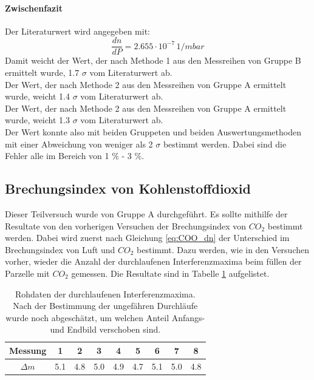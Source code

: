 \documentclass[12pt,a4paper]{article}
\begin{document}
\paragraph{Zwischenfazit}
Der Literaturwert wird angegeben mit:
\begin{equation*}
\dfrac{dn}{dP} = 2.655 \cdot 10^{-7} \, \si{1/mbar}
\end{equation*}
Damit weicht der Wert, der nach Methode 1 aus den Messreihen von Gruppe B ermittelt wurde, 1.7 $\sigma$ vom Literaturwert ab.\\
Der Wert, der nach Methode 2 aus den Messreihen von Gruppe A ermittelt wurde, weicht 1.4 $\sigma$ vom Literaturwert ab.\\
Der Wert, der nach Methode 2 aus den Messreihen von Gruppe A ermittelt wurde, weicht 1.3 $\sigma$ vom Literaturwert ab.\\
Der Wert konnte also mit beiden Gruppeten und beiden Auswertungsmethoden mit einer Abweichung von weniger als 2 $\sigma$ bestimmt werden. Dabei sind die Fehler alle im Bereich von 1 \% - 3 \%.

\newpage

\subsection{Brechungsindex von Kohlenstoffdioxid}
Dieser Teilversuch wurde von Gruppe A durchgeführt.
Es sollte mithilfe der Resultate von den vorherigen Versuchen der Brechungsindex von $CO_2$ bestimmt werden. Dabei wird zuerst nach Gleichung \ref{eq:COO_dn} der Unterschied im Brechungsindex von Luft und $CO_2$ bestimmt. Dazu werden, wie in den Versuchen vorher, wieder die Anzahl der durchlaufenen Interferenzmaxima beim füllen der Parzelle mit $CO_2$ gemessen. Die Resultate sind in Tabelle \ref{tab:COO_Rohdaten} aufgelistet.

\begin{table}
\center
\begin{tabular}{|c|c|c|c|c|c|c|c|c|}
\hline
Messung & 1 & 2 & 3 & 4 & 5 & 6 & 7 & 8\\
\hline
$\Delta m$ & 5.1 & 4.8 & 5.0 & 4.9 & 4.7 & 5.1 & 5.0 & 4.8\\
\hline
\end{tabular}
\caption{Rohdaten der durchlaufenen Interferenzmaxima. Nach der Bestimmung der ungefähren Durchläufe wurde noch abgeschätzt, um welchen Anteil Anfangs- und Endbild verschoben sind.}
\label{tab:COO_Rohdaten}
\end{table}
\end{document}
